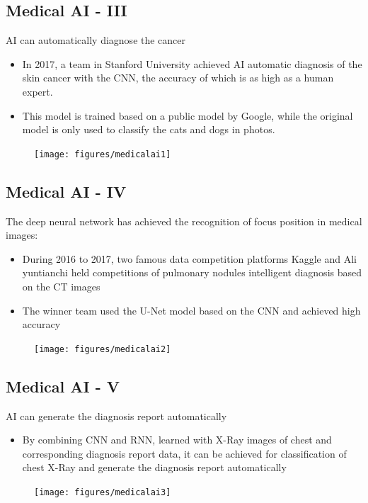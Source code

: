 \subsection{Medical AI - III}
AI can automatically diagnose the cancer
\begin{itemize}
\item In 2017,  a team in Stanford University achieved AI automatic diagnosis of the skin cancer with the CNN, the accuracy of which is as high as a human expert.
\item This model is trained based on a public model  by Google, while the original model is only used to classify the cats and dogs in photos.
\end{itemize}

\begin{figure}[H]
\centering
\texttt{[image: figures/medicalai1]}
\end{figure}

\subsection{Medical AI - IV}
The deep neural network has achieved the recognition of focus position in medical images:
\begin{itemize}
\item During 2016 to 2017, two famous data competition platforms Kaggle and Ali yuntianchi held competitions of pulmonary nodules intelligent diagnosis based on the CT images
\item The winner team used the U-Net model based on the CNN and achieved high accuracy
\end{itemize}
\begin{figure}[H]
\centering
\texttt{[image: figures/medicalai2]}
\end{figure}




\subsection{Medical AI - V}
AI can generate the diagnosis report automatically
\begin{itemize}
\item By combining CNN and RNN, learned with X-Ray images of chest and corresponding diagnosis report data, it can be achieved for classification of chest X-Ray and generate the diagnosis report automatically
\end{itemize}
\begin{figure}[H]
\centering
\texttt{[image: figures/medicalai3]}
\end{figure}




